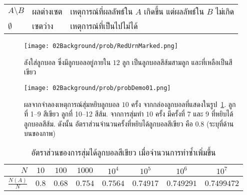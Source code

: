\begin{table}[hbtp]
\begin{center}
\begin{tabular}{lll}
				$A \setminus B$ & ผลต่างเซต  & เหตุการณ์ที่ผลลัพธ์ใน $A$ เกิดขึ้น แต่ผลลัพธ์ใน $B$ ไม่เกิด \\
				
				
				
				$\emptyset$ & เซตว่าง & เหตุการณ์ที่เป็นไปไม่ได้ \\
				
				\hline
			\end{tabular} 
		\end{center}
		\label{tbl: prob set jargon}
\end{table}






%
\begin{figure}
	\begin{center}
		\texttt{[image: 02Background/prob/RedUrnMarked.png]}
	\end{center}
	\caption[ตัวอย่างความน่าจะเป็น ลังใส่ลูกบอล]{ลังใส่ลูกบอล ซึ่งมีลูกบอลอยู่ภายใน $12$ ลูก เป็นลูกบอลสีส้มสามลูก และที่เหลือเป็นสีเขียว}
	\label{fig: prob red box}
\end{figure}
%

%
\begin{figure}
	\begin{center}
		\texttt{[image: 02Background/prob/probDemo01.png]}
	\end{center}
	\caption[ผลจากจำลองสุ่มหยิบลูกบอล]{ผลจากจำลองเหตุการณ์สุ่มหยิบลูกบอล $10$ ครั้ง จากกล่องลูกบอลที่แสดงในรูป~\ref{fig: prob red box}.
		ลูกที่ 1--9 สีเขียว ลูกที่ 10--12 สีส้ม.
		จากการสุ่มทำ $10$ ครั้ง มีครั้งที่ 7 และ 9 ที่หยิบได้ลูกบอลสีส้ม.
		ดังนั้น อัตราส่วนจำนวนครั้งที่หยิบได้ลูกบอลสีเขียว คือ $0.8$ (ระบุที่ด้านบนของภาพ)}
	\label{fig: prob red box result N 10}
\end{figure}
%

\begin{table}[hbtp]
		\caption[อัตราส่วนของการหยิบได้สีเขียว]{อัตราส่วนของการสุ่มได้ลูกบอลสีเขียว เมื่อจำนวนการทำซ้ำเพิ่มขึ้น}
		\begin{center}
			\begin{tabular}{|r|c|c|c|c|c|c|c|}
				\hline 
				$N$ & $10$ & $100$ & $1000$ & $10^4$ & $10^5$ & $10^6$ & $10^7$ \\
				\hline 
				$\frac{N(A)}{N}$ &
				$0.8$  & $0.68$  & $0.754$  & $0.7564$ & $0.74917$ & $0.749291$ &  $0.7499472$ \\
				\hline
			\end{tabular} 
		\end{center}
		\label{tbl: prob demo N(A)/N}
\end{table}

